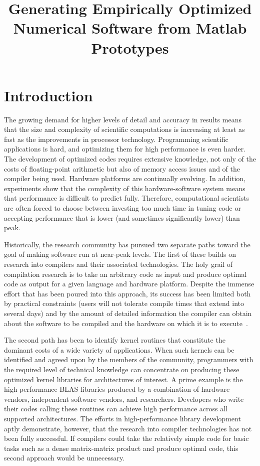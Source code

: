 \documentclass[11pt]{article}
\begin{document}
\title{Generating Empirically Optimized Numerical Software from Matlab Prototypes}

\abstract{}

\section{Introduction}
\label{sec:intro}


The growing demand for higher levels of detail and accuracy in results means that the size and complexity of scientific computations is increasing at least as fast as the improvements in processor technology. Programming scientific applications is hard, and optimizing them for high performance is even harder.  The development of optimized codes requires extensive knowledge, not only of the costs of floating-point arithmetic but also of  memory access issues and of the compiler being used. Hardware platforms are continually evolving. In addition, experiments show that the complexity of this  hardware-software system means that performance is difficult to predict fully.  Therefore, computational scientists are often forced to choose between investing too much time in tuning code or  accepting performance that is lower (and sometimes significantly lower) than peak.

Historically, the research community has pursued two separate paths toward the goal of making software run at near-peak levels.  The first of these builds on research into compilers and their associated technologies.  The holy grail of compilation research is to take an arbitrary code as input and produce optimal code as output for a given language and hardware platform.  Despite the immense effort that has been poured into this approach, its success has been limited both by practical constraints (users will not tolerate compile times that extend into several days) and by the amount of detailed information the compiler can obtain about the software to be compiled and the hardware on which it is to execute~\cite{Ken99,Wol89,Wol96}.

The second path has been to identify kernel routines that constitute the dominant costs of a wide variety of applications.  When such kernels can be identified and agreed upon by the members of the community, programmers with the required level of technical knowledge can concentrate on producing these optimized kernel libraries for architectures of interest. A prime example is the high-performance BLAS libraries produced by a combination of hardware vendors, independent software vendors, and researchers.  Developers who write their codes calling these routines can achieve high performance across all supported architectures. The efforts in high-performance library development aptly demonstrate, however, that the research into compiler technologies has not been fully successful.  If compilers could take the relatively simple code for basic tasks such as a dense matrix-matrix product and produce optimal code, this second approach would be unnecessary.
\end{document}
